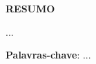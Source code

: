 \makeatletter
    \setlength{\absparsep}{18pt}
\makeatother

\begin{center}
    \textbf{RESUMO}
\end{center}
\vspace{.5cm}

\noindent
...

\vspace{18pt}\noindent\textbf{Palavras-chave}: ...